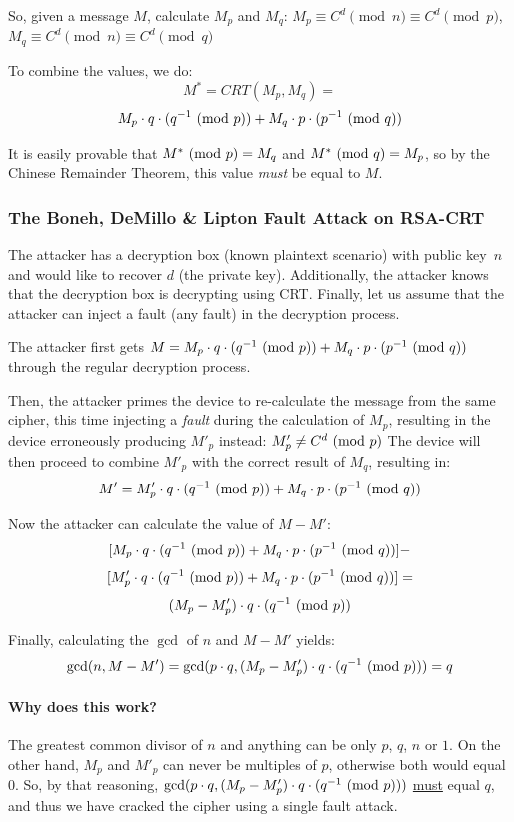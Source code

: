 So, given a message \(M\), calculate \(M_p\) and \(M_q\): \(M_p \equiv C^d
\pmod{n} \equiv C^d \pmod{p}\), \(M_q \equiv C^d \pmod{n} \equiv C^d \pmod{q}\)

To combine the values, we do:
\[M^* = CRT(M_p, M_q) = \]
\[M_p \cdot q \cdot (q^{-1} \ (\mathrm{mod}\ p)) + M_q \cdot p \cdot (p^{-1} \ (\mathrm{mod}\ q))\]

It is easily provable that \(M^* \ (\mathrm{mod}\ p) = M_q\) and \(M^* \ (\mathrm{mod}\ q) = M_p\), so
by the Chinese Remainder Theorem, this value \emph{must} be equal to \(M\).

\subsubsection{The Boneh, DeMillo \& Lipton Fault Attack on RSA-CRT~\cite{boneh}}\label{subsubsec:the_boneh_demillo_lipton_fault_attack_on_rsa_crt}

The attacker has a decryption box (known plaintext scenario) with public key\
\(n\) and would like to recover \(d\) (the private key). Additionally, the
attacker knows that the decryption box is decrypting using CRT\@. Finally, let
us assume that the attacker can inject a fault (any fault) in the decryption
process.

The attacker first gets \(M = M_p\cdot q\cdot (q^{-1} \ (\mathrm{mod}\ p)) + M_q\cdot
p\cdot (p^{-1} \ (\mathrm{mod}\ q))\) through the regular decryption process.

Then, the attacker primes the device to re-calculate the message from the same
cipher, this time injecting a \emph{fault} during the calculation of \(M_p\),
resulting in the device erroneously producing \(M'_p\) instead: \(M'_p \neq C^d
\ (\mathrm{mod}\ p)\) The device will then proceed to combine \(M'_p\) with the correct
result of \(M_q\), resulting in:
\[M' =  M'_p \cdot q \cdot (q^{-1} \ (\mathrm{mod}\ p)) + M_q \cdot p \cdot (p^{-1}
\ (\mathrm{mod}\ q))\]

Now the attacker can calculate the value of \(M - M'\):
\[[M_p \cdot q \cdot (q^{-1} \ (\mathrm{mod}\ p)) + M_q \cdot p \cdot (p^{-1} \ (\mathrm{mod}\ q))]-\]
\[[M'_p \cdot q \cdot (q^{-1} \ (\mathrm{mod}\ p)) + M_q \cdot p \cdot (p^{-1}
\ (\mathrm{mod}\ q))]=\]
\[(M_p - M'_p) \cdot q \cdot (q^{-1} \ (\mathrm{mod}\ p))\]

Finally, calculating the \(\gcd \) of \(n\) and \(M - M'\) yields:
\[\gcd(n, M - M') = \gcd(p \cdot q, (M_p - M'_p) \cdot q \cdot (q^{-1}
\ (\mathrm{mod}\ p))) = q\]

\paragraph{Why does this work?} The greatest common divisor of \(n\) and
anything can be only \(p\), \(q\), \(n\) or \(1\). On the other hand, \(M_p\)
and \(M'_p\) can never be multiples of \(p\), otherwise both would equal 0. So,
by that reasoning, \(\gcd(p \cdot q, (M_p - M'_p) \cdot q \cdot (q^{-1}
\ (\mathrm{mod}\ p)))\) \underline{must} equal \(q\), and thus we have cracked the cipher
using a single fault attack.

